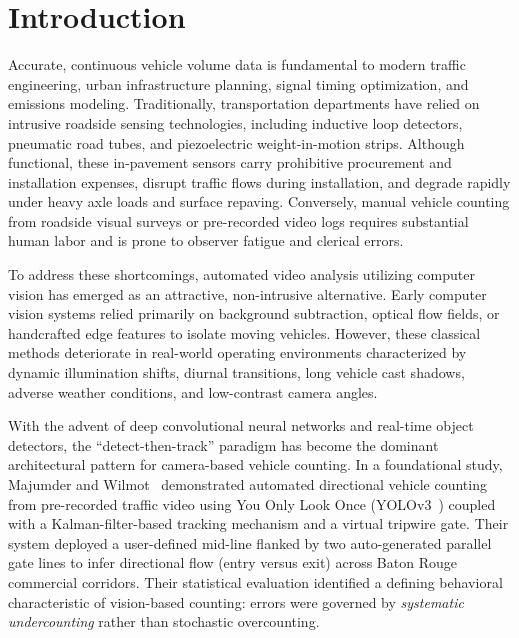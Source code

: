 \section{Introduction}
\label{sec:intro}

Accurate, continuous vehicle volume data is fundamental to modern traffic engineering, urban infrastructure planning, signal timing optimization, and emissions modeling. Traditionally, transportation departments have relied on intrusive roadside sensing technologies, including inductive loop detectors, pneumatic road tubes, and piezoelectric weight-in-motion strips. Although functional, these in-pavement sensors carry prohibitive procurement and installation expenses, disrupt traffic flows during installation, and degrade rapidly under heavy axle loads and surface repaving. Conversely, manual vehicle counting from roadside visual surveys or pre-recorded video logs requires substantial human labor and is prone to observer fatigue and clerical errors.

To address these shortcomings, automated video analysis utilizing computer vision has emerged as an attractive, non-intrusive alternative. Early computer vision systems relied primarily on background subtraction, optical flow fields, or handcrafted edge features to isolate moving vehicles. However, these classical methods deteriorate in real-world operating environments characterized by dynamic illumination shifts, diurnal transitions, long vehicle cast shadows, adverse weather conditions, and low-contrast camera angles.

With the advent of deep convolutional neural networks and real-time object detectors, the ``detect-then-track'' paradigm has become the dominant architectural pattern for camera-based vehicle counting. In a foundational study, Majumder and Wilmot~\cite{majumder2023automated} demonstrated automated directional vehicle counting from pre-recorded traffic video using You Only Look Once (YOLOv3~\cite{redmon2018yolov3}) coupled with a Kalman-filter-based tracking mechanism and a virtual tripwire gate. Their system deployed a user-defined mid-line flanked by two auto-generated parallel gate lines to infer directional flow (entry versus exit) across Baton Rouge commercial corridors. Their statistical evaluation identified a defining behavioral characteristic of vision-based counting: errors were governed by \textit{systematic undercounting} rather than stochastic overcounting.


